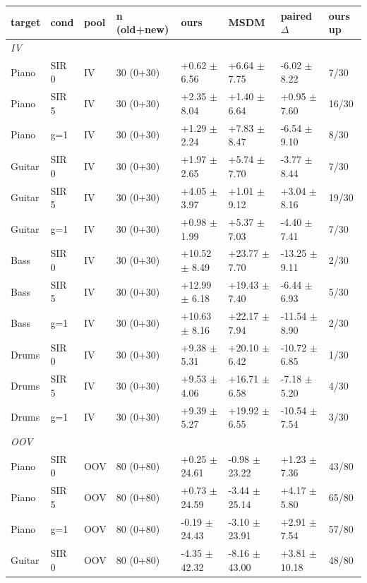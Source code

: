 \begin{tabular}{llllllll}
\toprule
target & cond & pool & n (old+new) & ours & MSDM & paired $\Delta$ & ours up\\
\midrule
\multicolumn{8}{l}{\emph{IV}}\\
Piano & SIR 0 & IV & 30 (0+30) & +0.62 $\pm$ 6.56 & +6.64 $\pm$ 7.75 & -6.02 $\pm$ 8.22 & 7/30\\
Piano & SIR 5 & IV & 30 (0+30) & +2.35 $\pm$ 8.04 & +1.40 $\pm$ 6.64 & +0.95 $\pm$ 7.60 & 16/30\\
Piano & g=1 & IV & 30 (0+30) & +1.29 $\pm$ 2.24 & +7.83 $\pm$ 8.47 & -6.54 $\pm$ 9.10 & 8/30\\
Guitar & SIR 0 & IV & 30 (0+30) & +1.97 $\pm$ 2.65 & +5.74 $\pm$ 7.70 & -3.77 $\pm$ 8.44 & 7/30\\
Guitar & SIR 5 & IV & 30 (0+30) & +4.05 $\pm$ 3.97 & +1.01 $\pm$ 9.12 & +3.04 $\pm$ 8.16 & 19/30\\
Guitar & g=1 & IV & 30 (0+30) & +0.98 $\pm$ 1.99 & +5.37 $\pm$ 7.03 & -4.40 $\pm$ 7.41 & 7/30\\
Bass & SIR 0 & IV & 30 (0+30) & +10.52 $\pm$ 8.49 & +23.77 $\pm$ 7.70 & -13.25 $\pm$ 9.11 & 2/30\\
Bass & SIR 5 & IV & 30 (0+30) & +12.99 $\pm$ 6.18 & +19.43 $\pm$ 7.40 & -6.44 $\pm$ 6.93 & 5/30\\
Bass & g=1 & IV & 30 (0+30) & +10.63 $\pm$ 8.16 & +22.17 $\pm$ 7.94 & -11.54 $\pm$ 8.90 & 2/30\\
Drums & SIR 0 & IV & 30 (0+30) & +9.38 $\pm$ 5.31 & +20.10 $\pm$ 6.42 & -10.72 $\pm$ 6.85 & 1/30\\
Drums & SIR 5 & IV & 30 (0+30) & +9.53 $\pm$ 4.06 & +16.71 $\pm$ 6.58 & -7.18 $\pm$ 5.20 & 4/30\\
Drums & g=1 & IV & 30 (0+30) & +9.39 $\pm$ 5.27 & +19.92 $\pm$ 6.55 & -10.54 $\pm$ 7.54 & 3/30\\
\midrule
\multicolumn{8}{l}{\emph{OOV}}\\
Piano & SIR 0 & OOV & 80 (0+80) & +0.25 $\pm$ 24.61 & -0.98 $\pm$ 23.22 & +1.23 $\pm$ 7.36 & 43/80\\
Piano & SIR 5 & OOV & 80 (0+80) & +0.73 $\pm$ 24.59 & -3.44 $\pm$ 25.14 & +4.17 $\pm$ 5.80 & 65/80\\
Piano & g=1 & OOV & 80 (0+80) & -0.19 $\pm$ 24.43 & -3.10 $\pm$ 23.91 & +2.91 $\pm$ 7.54 & 57/80\\
Guitar & SIR 0 & OOV & 80 (0+80) & -4.35 $\pm$ 42.32 & -8.16 $\pm$ 43.00 & +3.81 $\pm$ 10.18 & 48/80\\

\end{tabular}
